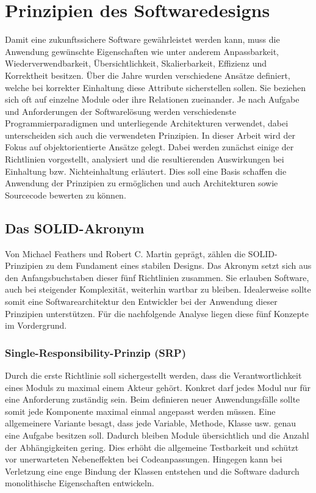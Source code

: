 \documentclass[conference]{IEEEtran}
\begin{document}


\section{Prinzipien des Softwaredesigns}

Damit eine zukunftssichere Software gewährleistet werden kann, muss die Anwendung gewünschte Eigenschaften wie unter anderem Anpassbarkeit, Wiederverwendbarkeit, Übersichtlichkeit, Skalierbarkeit, Effizienz und Korrektheit besitzen. Über die Jahre wurden verschiedene Ansätze definiert, welche bei korrekter Einhaltung diese Attribute sicherstellen sollen. Sie beziehen sich oft auf einzelne Module oder ihre Relationen zueinander. Je nach Aufgabe und Anforderungen der Softwarelösung werden verschiedenste Programmierparadigmen und unterliegende Architekturen verwendet, dabei unterscheiden sich auch die verwendeten Prinzipien. In dieser Arbeit wird der Fokus auf objektorientierte Ansätze gelegt. Dabei werden zunächst einige der Richtlinien vorgestellt, analysiert und die resultierenden Auswirkungen bei Einhaltung bzw. Nichteinhaltung erläutert. Dies soll eine Basis schaffen die Anwendung der Prinzipien zu ermöglichen und auch Architekturen sowie Sourcecode bewerten zu können.



\subsection{Das SOLID-Akronym}

Von Michael Feathers und Robert C. Martin geprägt, zählen die SOLID-Prinzipien zu dem Fundament eines stabilen Designs. \cite{martin.solid} \cite{Martin.2018} Das Akronym setzt sich aus den Anfangsbuchstaben dieser fünf Richtlinien zusammen. Sie erlauben Software, auch bei steigender Komplexität, weiterhin wartbar zu bleiben. Idealerweise sollte somit eine Softwarearchitektur den Entwickler bei der Anwendung dieser Prinzipien unterstützen. Für die nachfolgende Analyse liegen diese fünf Konzepte im Vordergrund.



\subsubsection{Single-Responsibility-Prinzip (SRP)} Durch die erste Richtlinie soll sichergestellt werden, dass die Verantwortlichkeit eines Moduls zu maximal einem Akteur gehört. Konkret darf jedes Modul nur für eine Anforderung zuständig sein. Beim definieren neuer Anwendungsfälle sollte somit jede Komponente maximal einmal angepasst werden müssen. Eine allgemeinere Variante besagt, dass jede Variable, Methode, Klasse usw. genau eine Aufgabe besitzen soll. Dadurch bleiben Module übersichtlich und die Anzahl der Abhängigkeiten gering. Dies erhöht die allgemeine Testbarkeit und schützt vor unerwarteten Nebeneffekten bei Codeanpassungen. Hingegen kann bei Verletzung eine enge Bindung der Klassen entstehen und die Software dadurch monolithische Eigenschaften entwickeln. \cite{martin.srp} \cite{Martin.2003} \cite{Martin.2018}
\end{document}
